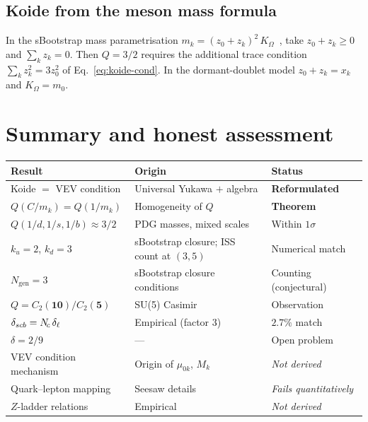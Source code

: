 \documentclass[11pt,a4paper]{article}
\begin{document}
\subsection{Koide from the meson mass formula}

In the sBootstrap mass parametrisation
$m_k = (z_0+z_k)^2\,K_\Omega$~\cite{Rivero2024}, take
$z_0+z_k\geq0$ and $\sum_k z_k=0$.  Then $Q=3/2$ requires the
additional trace condition $\sum_k z_k^2=3z_0^2$ of
Eq.~\eqref{eq:koide-cond}.  In the dormant-doublet model
$z_0+z_k=x_k$ and $K_\Omega=m_0$.

\section{Summary and honest assessment}
\label{sec:summary}

\begin{center}
\renewcommand{\arraystretch}{1.3}
\begin{tabular}{@{}lll@{}}
\toprule
\textbf{Result} & \textbf{Origin} & \textbf{Status} \\
\midrule
Koide $=$ VEV condition & Universal Yukawa $+$ algebra
  & \textbf{Reformulated} \\
$Q(C/m_k) = Q(1/m_k)$ & Homogeneity of $Q$
  & \textbf{Theorem} \\
$Q(1/d,1/s,1/b) \approx 3/2$ & PDG masses, mixed scales
  & Within $1\sigma$ \\
\midrule
$k_u = 2$, $k_d = 3$ & sBootstrap closure; ISS count at $(3,5)$
  & Numerical match \\
$N_{\text{gen}} = 3$ & sBootstrap closure conditions
  & Counting (conjectural) \\
$Q = C_2(\mathbf{10})/C_2(\mathbf{5})$ & SU(5) Casimir
  & Observation \\
$\delta_{scb} = N_{\!c}\,\delta_\ell$ & Empirical (factor 3)
  & $2.7\%$ match \\
$\delta = 2/9$ & --- & Open problem \\
\midrule
VEV condition mechanism & Origin of $\mu_{0k}$, $M_k$
  & \emph{Not derived} \\
Quark--lepton mapping & Seesaw details
  & \emph{Fails quantitatively} \\
$Z$-ladder relations & Empirical
  & \emph{Not derived} \\
\bottomrule
\end{tabular}
\end{center}
\end{document}
